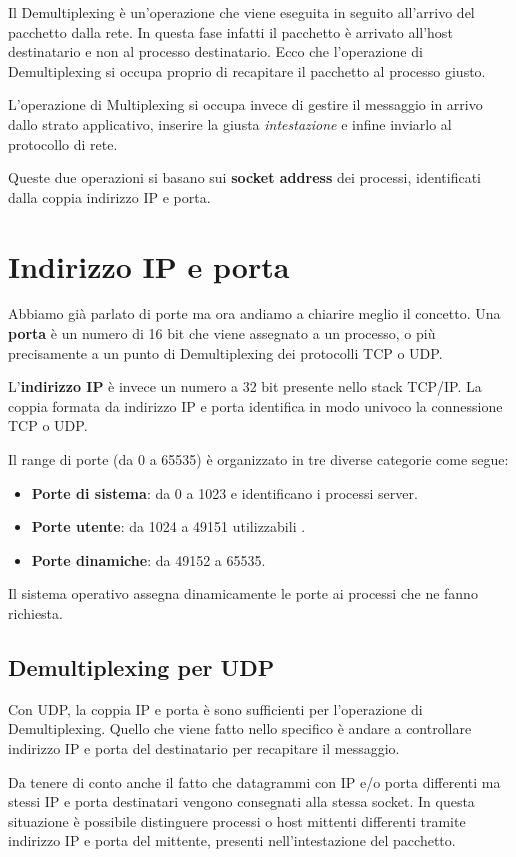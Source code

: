Il Demultiplexing è un'operazione che viene eseguita in seguito 
all'arrivo del pacchetto dalla rete. In questa fase infatti il 
pacchetto è arrivato all'host destinatario e non al processo 
destinatario. Ecco che l'operazione di Demultiplexing si occupa proprio
di recapitare il pacchetto al processo giusto.

L'operazione di Multiplexing si occupa invece di gestire il messaggio 
in arrivo dallo strato applicativo, inserire la giusta 
\emph{intestazione} e infine inviarlo al protocollo di rete.

Queste due operazioni si basano sui \textbf{socket address} dei 
processi, identificati dalla coppia indirizzo IP e porta.

\section{Indirizzo IP e porta}
Abbiamo già parlato di porte ma ora andiamo a chiarire meglio il 
concetto. Una \textbf{porta} è un numero di 16 bit che viene assegnato 
a un processo, o più precisamente a un punto di Demultiplexing dei 
protocolli TCP o UDP.

L'\textbf{indirizzo IP} è invece un numero a 32 bit presente nello 
stack TCP/IP. La coppia formata da indirizzo IP e porta identifica in 
modo univoco la connessione TCP o UDP.

Il range di porte (da 0 a 65535) è organizzato in tre diverse categorie
come segue:
\begin{itemize}
	\item \textbf{Porte di sistema}: da 0 a 1023 e identificano i 
		processi server.
	\item \textbf{Porte utente}: da 1024 a 49151 utilizzabili .
	\item \textbf{Porte dinamiche}: da 49152 a 65535.
\end{itemize}
Il sistema operativo assegna dinamicamente le porte ai processi che ne 
fanno richiesta.

\subsection{Demultiplexing per UDP}
Con UDP, la coppia IP e porta è sono sufficienti per l'operazione di 
Demultiplexing. Quello che viene fatto nello specifico è andare a 
controllare indirizzo IP e porta del destinatario per recapitare il 
messaggio.

Da tenere di conto anche il fatto che datagrammi con IP e/o porta 
differenti ma stessi IP e porta destinatari vengono consegnati alla 
stessa socket. In questa situazione è possibile distinguere processi o 
host mittenti differenti tramite indirizzo IP e porta del mittente, 
presenti
nell'intestazione del pacchetto.

